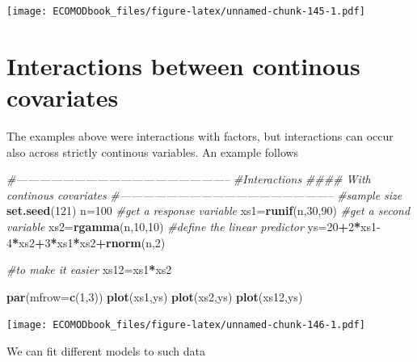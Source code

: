 \documentclass[
]{book}
\newenvironment{Shaded}{\begin{snugshade}}{\end{snugshade}}
\newcommand{\CommentTok}[1]{\textcolor[rgb]{0.56,0.35,0.01}{\textit{#1}}}
\newcommand{\DataTypeTok}[1]{\textcolor[rgb]{0.13,0.29,0.53}{#1}}
\newcommand{\DecValTok}[1]{\textcolor[rgb]{0.00,0.00,0.81}{#1}}
\newcommand{\KeywordTok}[1]{\textcolor[rgb]{0.13,0.29,0.53}{\textbf{#1}}}
\newcommand{\NormalTok}[1]{#1}
\newcommand{\OperatorTok}[1]{\textcolor[rgb]{0.81,0.36,0.00}{\textbf{#1}}}
\begin{document}
\texttt{[image: ECOMODbook\_files/figure-latex/unnamed-chunk-145-1.pdf]}

\hypertarget{interactions-between-continous-covariates}{%
\section{Interactions between continous covariates}\label{interactions-between-continous-covariates}}

The examples above were interactions with factors, but interactions can occur also across strictly continous variables. An example follows

\begin{Shaded}
\begin{Highlighting}[]
\CommentTok{#--------------------------------------------------------}
\CommentTok{#Interactions}
\CommentTok{#### With continous covariates}
\CommentTok{#--------------------------------------------------------}
\CommentTok{#sample size}
\KeywordTok{set.seed}\NormalTok{(}\DecValTok{121}\NormalTok{)}
\NormalTok{n=}\DecValTok{100}
\CommentTok{#get a response variable}
\NormalTok{xs1=}\KeywordTok{runif}\NormalTok{(n,}\DecValTok{30}\NormalTok{,}\DecValTok{90}\NormalTok{)}
\CommentTok{#get a second variable}
\NormalTok{xs2=}\KeywordTok{rgamma}\NormalTok{(n,}\DecValTok{10}\NormalTok{,}\DecValTok{10}\NormalTok{)}
\CommentTok{#define the linear predictor}
\NormalTok{ys=}\DecValTok{20}\OperatorTok{+}\DecValTok{2}\OperatorTok{*}\NormalTok{xs1}\DecValTok{-4}\OperatorTok{*}\NormalTok{xs2}\OperatorTok{+}\DecValTok{3}\OperatorTok{*}\NormalTok{xs1}\OperatorTok{*}\NormalTok{xs2}\OperatorTok{+}\KeywordTok{rnorm}\NormalTok{(n,}\DecValTok{2}\NormalTok{)}

\CommentTok{#to make it easier}
\NormalTok{xs12=xs1}\OperatorTok{*}\NormalTok{xs2}

\KeywordTok{par}\NormalTok{(}\DataTypeTok{mfrow=}\KeywordTok{c}\NormalTok{(}\DecValTok{1}\NormalTok{,}\DecValTok{3}\NormalTok{))}
\KeywordTok{plot}\NormalTok{(xs1,ys)}
\KeywordTok{plot}\NormalTok{(xs2,ys)}
\KeywordTok{plot}\NormalTok{(xs12,ys)}
\end{Highlighting}
\end{Shaded}

\texttt{[image: ECOMODbook\_files/figure-latex/unnamed-chunk-146-1.pdf]}

We can fit different models to such data
\end{document}

